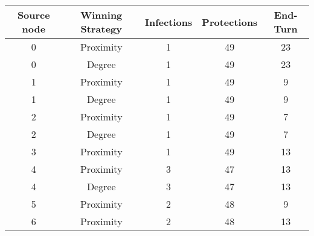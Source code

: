 \documentclass[results.tex]{subfiles}
\begin{document}
    \begin{center}
        \begin{tabular}{| c || c | c | c | c |}
            \hline
            {\bfseries Source node} & {\bfseries Winning Strategy} & {\bfseries Infections} & {\bfseries Protections}
            & {\bfseries End-Turn}
            \\  %
            \hline\hline
            0                       & Proximity                    & 1                      & 49                      & 23                   \\
            \hline
            0                       & Degree                       & 1                      & 49                      & 23                   \\
            \hline
            1                       & Proximity                    & 1                      & 49                      & 9                    \\
            \hline
            1                       & Degree                       & 1                      & 49                      & 9                    \\
            \hline
            2                       & Proximity                    & 1                      & 49                      & 7                    \\
            \hline
            2                       & Degree                       & 1                      & 49                      & 7                    \\
            \hline
            3                       & Proximity                    & 1                      & 49                      & 13                   \\
            \hline
            4                       & Proximity                    & 3                      & 47                      & 13                   \\
            \hline
            4                       & Degree                       & 3                      & 47                      & 13                   \\
            \hline
            5                       & Proximity                    & 2                      & 48                      & 9                    \\
            \hline
            6                       & Proximity                    & 2                      & 48                      & 13                   \\

\end{tabular}
\end{center}
\end{document}
